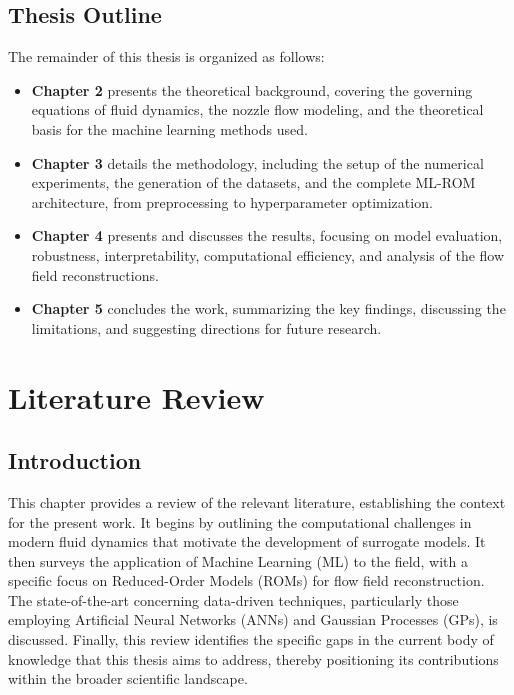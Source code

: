 \documentclass[dscexam, EN]{ufabcFHZh}
\begin{document}
\section{Thesis Outline}
The remainder of this thesis is organized as follows:
\begin{itemize}
    \item \textbf{Chapter 2} presents the theoretical background, covering the governing equations of fluid dynamics, the nozzle flow modeling, and the theoretical basis for the machine learning methods used.
    \item \textbf{Chapter 3} details the methodology, including the setup of the numerical experiments, the generation of the datasets, and the complete ML-ROM architecture, from preprocessing to hyperparameter optimization.
    \item \textbf{Chapter 4} presents and discusses the results, focusing on model evaluation, robustness, interpretability, computational efficiency, and analysis of the flow field reconstructions.
    \item \textbf{Chapter 5} concludes the work, summarizing the key findings, discussing the limitations, and suggesting directions for future research.
\end{itemize}

\chapter{Literature Review}
\label{chap:lit_review}

\section{Introduction}

This chapter provides a review of the relevant literature, establishing the context for the present work. It begins by outlining the computational challenges in modern fluid dynamics that motivate the development of surrogate models. It then surveys the application of Machine Learning (ML) to the field, with a specific focus on Reduced-Order Models (ROMs) for flow field reconstruction. The state-of-the-art concerning data-driven techniques, particularly those employing Artificial Neural Networks (ANNs) and Gaussian Processes (GPs), is discussed. Finally, this review identifies the specific gaps in the current body of knowledge that this thesis aims to address, thereby positioning its contributions within the broader scientific landscape.
\end{document}
